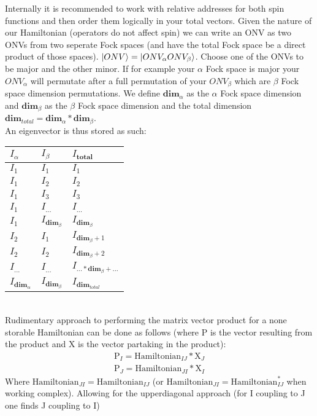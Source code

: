 \documentclass[12p]{article}
\begin{document}
Internally it is recommended to work with relative addresses for both spin functions and then order them logically in your total vectors. Given the nature of our Hamiltonian (operators do not affect spin) we can write an ONV as two ONVs from two seperate Fock spaces (and have the total Fock space be a direct product of those spaces). $\ket{ONV} = \ket{ONV_\alpha ONV_\beta}$. Choose one of the ONVs to be major and the other minor. If for example your $\alpha$ Fock space is major your $ONV_\alpha$ will permutate after a full permutation of your $ONV_\beta$ which are $\beta$ Fock space dimension permutations.
We define $\textbf{dim}_\alpha$ as the $\alpha$ Fock space dimension and $\textbf{dim}_\beta$ as the $\beta$ Fock space dimension and the total dimension $\textbf{dim}_{total} = \textbf{dim}_\alpha * \textbf{dim}_\beta$. \\
An eigenvector is thus stored as such:
\begin{tabular}{|l|l||l|}
\hline
$I_{\alpha}$ & $I_{\beta}$ & $I_{\textbf{total}}$ \\ \hline
$I_1$ & $I_1$ & $I_1$ \\ \hline
$I_1$ & $I_2$ & $I_2$ \\ \hline
$I_1$ & $I_3$ & $I_3$ \\ \hline
$I_1$ & $I_{...}$ & $I_{...}$ \\ \hline
$I_1$ & $I_{\textbf{dim}_\beta}$ & $I_{\textbf{dim}_\beta}$ \\ \hline
$I_2$ & $I_{1}$ & $I_{\textbf{dim}_\beta + 1}$ \\ \hline
$I_2$ & $I_{2}$ & $I_{\textbf{dim}_\beta + 2}$ \\ \hline
$I_{...}$ & $I_{...}$ & $I_{... * \textbf{dim}_\beta + ...}$ \\ \hline
$I_{\textbf{dim}_\alpha}$ & $I_{\textbf{dim}_\beta}$ & $I_{\textbf{dim}_{total}}$ \\ \hline
\end{tabular}
\\
Rudimentary approach to performing the matrix vector product for a none storable Hamiltonian can be done as follows (where P is the vector resulting from the product and X is the vector partaking in the product):
\begin{align}
  \text{P}_{I} = \text{Hamiltonian}_{IJ} * \text{X}_{J} \\
  \text{P}_{J} = \text{Hamiltonian}_{JI} * \text{X}_{I}
\end{align}
Where $\text{Hamiltonian}_{JI} = \text{Hamiltonian}_{IJ}$ (or $\text{Hamiltonian}_{JI} = \text{Hamiltonian}_{IJ}^*$ when working complex). Allowing for the upperdiagonal approach (for I coupling to J one finds J coupling to I)
\end{document}
